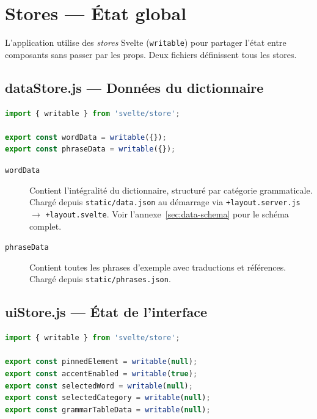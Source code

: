 \section{Stores --- État global}

L'application utilise des \emph{stores} Svelte (\texttt{writable}) pour partager l'état entre composants sans passer par les props. Deux fichiers définissent tous les stores.

\subsection{dataStore.js --- Données du dictionnaire}

\begin{lstlisting}[language=javascript, title=src/lib/stores/dataStore.js]
import { writable } from 'svelte/store';

export const wordData = writable({});
export const phraseData = writable({});
\end{lstlisting}

\begin{description}
  \item[\texttt{wordData}] Contient l'intégralité du dictionnaire, structuré par catégorie grammaticale. Chargé depuis \texttt{static/data.json} au démarrage via \texttt{+layout.server.js} $\rightarrow$ \texttt{+layout.svelte}. Voir l'annexe~\ref{sec:data-schema} pour le schéma complet.

  \item[\texttt{phraseData}] Contient toutes les phrases d'exemple avec traductions et références. Chargé depuis \texttt{static/phrases.json}.
\end{description}

\subsection{uiStore.js --- État de l'interface}

\begin{lstlisting}[language=javascript, title=src/lib/stores/uiStore.js]
import { writable } from 'svelte/store';

export const pinnedElement = writable(null);
export const accentEnabled = writable(true);
export const selectedWord = writable(null);
export const selectedCategory = writable(null);
export const grammarTableData = writable(null);
\end{lstlisting}

